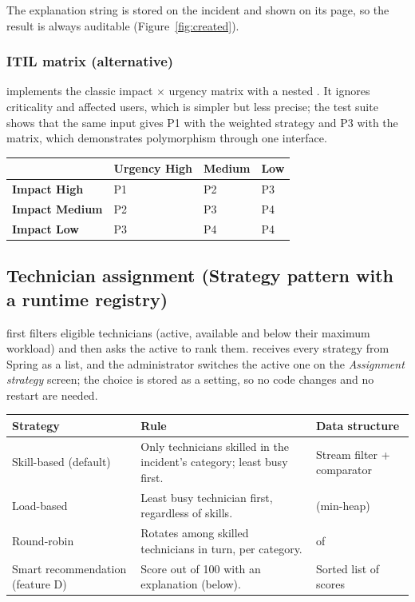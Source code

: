 The explanation string is stored on the incident and shown on its page, so the result is always auditable (Figure~\ref{fig:created}).

\subsubsection*{ITIL matrix (alternative)}
 implements the classic impact $\times$ urgency matrix with a nested . It ignores criticality and affected users, which is simpler but less precise; the test suite shows that the same input gives P1 with the weighted strategy and P3 with the matrix, which demonstrates polymorphism through one interface.

\begin{tabularx}{0.62\linewidth}{@{}l YYY@{}}
\toprule
 & \textbf{Urgency High} & \textbf{Medium} & \textbf{Low} \\
\midrule
\textbf{Impact High} & P1 & P2 & P3 \\
\textbf{Impact Medium} & P2 & P3 & P4 \\
\textbf{Impact Low} & P3 & P4 & P4 \\
\bottomrule
\end{tabularx}

\subsection{Technician assignment (Strategy pattern with a runtime registry)}
 first filters eligible technicians (active, available and below their maximum workload) and then asks the active  to rank them.  receives every strategy from Spring as a list, and the administrator switches the active one on the \emph{Assignment strategy} screen; the choice is stored as a setting, so no code changes and no restart are needed.

\begin{longtable}{@{}L{3.3cm}L{7.6cm}L{4.3cm}@{}}
\toprule
\textbf{Strategy} & \textbf{Rule} & \textbf{Data structure} \\
\midrule\endhead
Skill-based (default) & Only technicians skilled in the incident's category; least busy first. & Stream filter + comparator \\
Load-based & Least busy technician first, regardless of skills. &  (min-heap) \\
Round-robin & Rotates among skilled technicians in turn, per category. &  of  \\
Smart recommendation (feature D) & Score out of 100 with an explanation (below). & Sorted list of scores \\
\bottomrule
\end{longtable}

